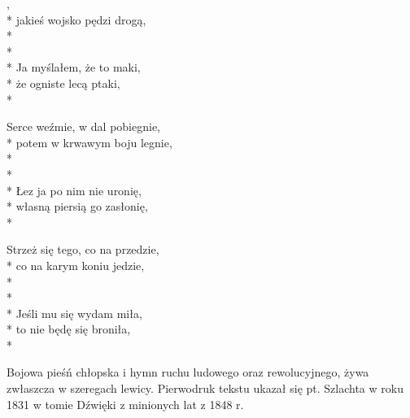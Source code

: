 \begin{lyrics}[longestline={niech mnie zabiera, zabiera, zabiera.}]

,\\*
jakieś wojsko pędzi drogą,\\*
\\*
\\*
Ja myślałem, że to maki,\\*
że ogniste lecą ptaki,\\*

Serce weźmie, w dal pobiegnie,\\*
potem w krwawym boju legnie,\\*
\\*
\\*
Łez ja po nim nie uronię,\\*
własną piersią go zasłonię,\\*

Strzeż się tego, co na przedzie,\\*
co na karym koniu jedzie,\\*
\\*
\\*
Jeśli mu się wydam miła,\\*
to nie będę się broniła,\\*
\end{lyrics}



\begin{info}Bojowa pieśń chłopska i hymn ruchu ludowego oraz rewolucyjnego, żywa zwłaszcza w szeregach lewicy. Pierwodruk tekstu ukazał się pt. Szlachta w roku 1831 w tomie Dźwięki z minionych lat z 1848 r.\end{info}

